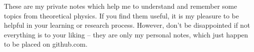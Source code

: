 \documentclass[main.tex]{subfiles}
\begin{document}
   These are my private notes which help me to understand and remember some topics from theoretical physics. If you find them useful, it is my pleasure to be helpful in your learning or research process. However, don't be disappointed if not everything is to your liking -- they are only my personal notes, which just happen to be placed on github.com.
\end{document}
